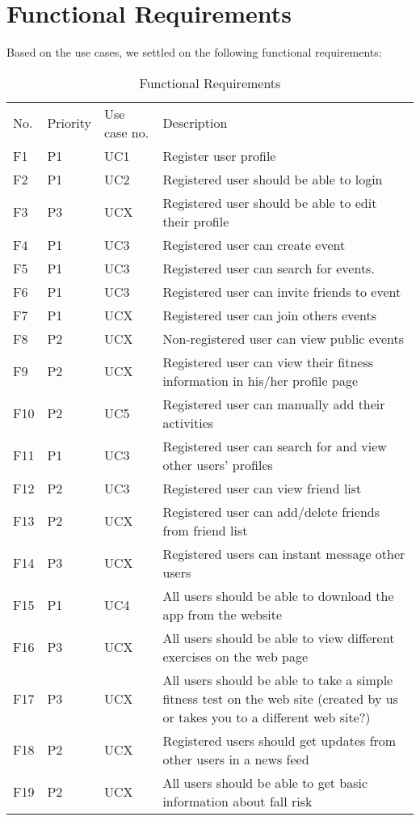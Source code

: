 \section{Functional Requirements}
Based on the use cases, we settled on the following functional requirements: 
\begin{center}
\begin{table}[H]
    \centering
\begin{tabular}{ |C{0.05\linewidth}|C{0.1\linewidth}|C{0.15\linewidth}|L{0.7\linewidth}| } 
 \hline {}
  \\
 \hline
 No. & Priority & Use case no. & Description \\
 \hline
 F1 & P1 & UC1 & Register user profile \\ 
 \hline
 F2 & P1 & UC2 & Registered user should be able to login \\ 
  \hline
 F3 & P3 & UCX & Registered user should be able to edit their profile \\
  \hline
 F4 & P1 & UC3 & Registered user can create event \\
  \hline
 F5 & P1 & UC3 & Registered user can search for events. \\
  \hline
 F6 & P1 & UC3 & Registered user can invite friends to event \\
  \hline
 F7 & P1 & UCX & Registered user can join others events \\
  \hline
 F8 & P2 & UCX & Non-registered user can view public events \\
  \hline
 F9 & P2 & UCX & Registered user can view their fitness information in his/her profile page \\
  \hline
 F10 & P2 & UC5  & Registered user can manually add their activities \\
  \hline
 F11 & P1 & UC3  & Registered user can search for and view other users’ profiles \\
  \hline
 F12 & P2 & UC3  & Registered user can view friend list \\
  \hline
 F13 & P2 & UCX  & Registered user can add/delete friends from friend list \\
  \hline
 F14 & P3 & UCX  & Registered users can instant message other users \\
  \hline
 F15 & P1 & UC4  & All users should be able to download the app from the website \\
  \hline
 F16 & P3 & UCX  & All users should be able to view different exercises on the web page \\
  \hline
 F17 & P3 & UCX  & All users should be able to take a simple fitness test on the web site (created by us or takes you to a different web site?) \\
  \hline
 F18 & P2 & UCX  & Registered users should get updates from other users in a news feed \\
  \hline
 F19 & P2 & UCX  & All users should be able to get basic information about fall risk \\
 \hline
\end{tabular}
\caption{Functional Requirements}
 \label{table:funcReq}
\end{table}
\end{center}


